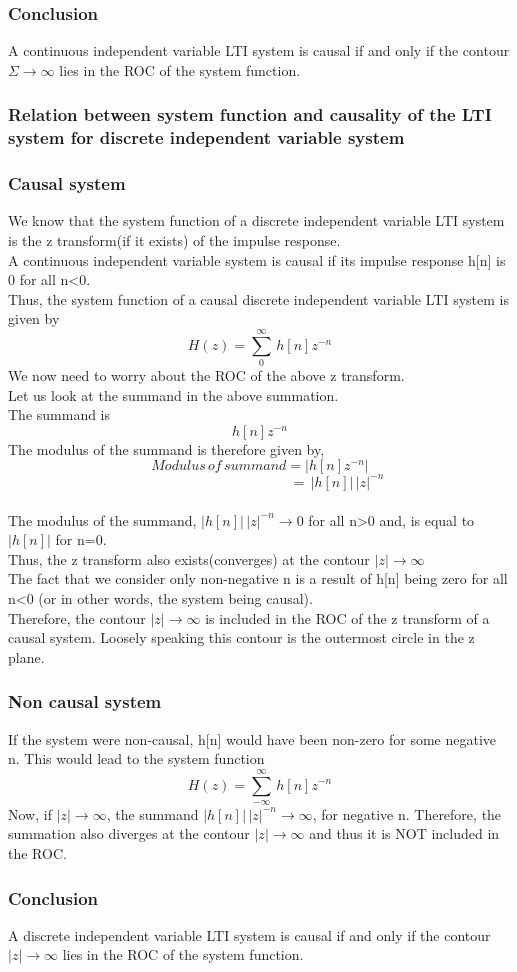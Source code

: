 \subsubsection{Conclusion}
A continuous independent variable LTI system is causal if and only if the contour $\Sigma \rightarrow \infty$ lies in the ROC of the system function.
\subsubsection{Relation between system function and causality of the LTI system for discrete independent variable system}
\subsubsection{Causal system}
We know that the system function of a discrete independent variable LTI system is the z transform(if it exists) of the impulse response. \\
A continuous independent variable system is causal if its impulse response h[n] is 0 for all n<0. \\
Thus, the system function of a causal discrete independent variable LTI system is given by
\[ H(z) = \sum_{0}^{\infty } \, h[n]z^{-n} \]
We now need to worry about the ROC of the above z transform.\\
Let us look at the summand in the above summation.\\ 
The summand is
\[ h[n] z^{-n} \]
The modulus of the summand is therefore given by,
\[Modulus\, of\, summand =  |h[n] z^{-n}|\]
\[ \quad \quad \quad \quad \quad \quad \quad \quad \quad \quad \quad       = \, |h[n]|\,|z|^{-n} \]\\

The modulus of the summand, $|h[n]|\, |z|^{-n} \rightarrow 0$ for all n>0 and,
is equal to $|h[n]|$ for n=0. \\
Thus, the z transform also exists(converges) at the contour $|z| \rightarrow \infty $ \\
The fact that we consider only non-negative n is a result of h[n] being zero for all n<0 (or in other words, the system being causal). \\

Therefore, the contour $|z| \rightarrow \infty $ is included in the ROC of the z transform of a causal system. Loosely speaking this contour is the outermost circle in the z plane.
\subsubsection{Non causal system}
If the system were non-causal, h[n] would have been non-zero for some negative n. This would lead to the system function 
\[ H(z) = \sum_{-\infty }^{\infty } \, h[n]z^{-n} \]
Now, if $|z| \rightarrow \infty $, the summand $|h[n]|\,|z|^{-n} \rightarrow \infty $, for negative n. 
Therefore, the summation also diverges at the contour $ |z| \rightarrow \infty $ and thus it is NOT included in the ROC.

\subsubsection{Conclusion}
A discrete independent variable LTI system is causal if and only if the contour $|z| \rightarrow \infty $ lies in the ROC of the system function.
